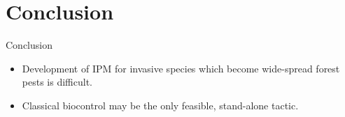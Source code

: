 \documentclass[]{beamer}
\begin{document}
%
%

\section{Conclusion}

\begin{frame}{Conclusion}
	\begin{itemize}
	\item Development of IPM for invasive species which become wide-spread forest pests is difficult.
	\item Classical biocontrol may be the only feasible, stand-alone tactic.
	\end{itemize}
\end{frame}

\begin{frame}{}
\end{frame}
\end{document}
